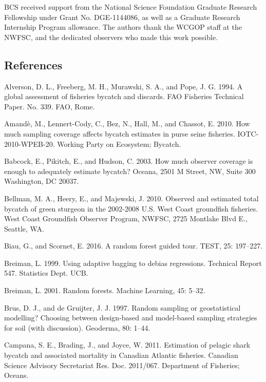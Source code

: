 \documentclass[]{article}
\begin{document}
BCS received support from the National Science Foundation Graduate
Research Fellowship under Grant No. DGE-1144086, as well as a Graduate
Research Internship Program allowance. The authors thank the WCGOP staff
at the NWFSC, and the dedicated observers who made this work possible.

\subsection{References}\label{references}

\hypertarget{refs}{}
\hypertarget{ref-alverson1994}{}
Alverson, D. L., Freeberg, M. H., Murawski, S. A., and Pope, J. G. 1994.
A global assessment of fisheries bycatch and discards. FAO Fisheries
Technical Paper. No. 339. FAO, Rome.

\hypertarget{ref-amande2010b}{}
Amandè, M., Lennert-Cody, C., Bez, N., Hall, M., and Chassot, E. 2010.
How much sampling coverage affects bycatch estimates in purse seine
fisheries. IOTC-2010-WPEB-20. Working Party on Ecosystem; Bycatch.

\hypertarget{ref-babcock2003}{}
Babcock, E., Pikitch, E., and Hudson, C. 2003. How much observer
coverage is enough to adequately estimate bycatch? Oceana, 2501 M
Street, NW, Suite 300 Washington, DC 20037.

\hypertarget{ref-bellman2010}{}
Bellman, M. A., Heery, E., and Majewski, J. 2010. Observed and estimated
total bycatch of green sturgeon in the 2002-2008 U.S. West Coast
groundfish fisheries. West Coast Groundfish Observer Program, NWFSC,
2725 Montlake Blvd E., Seattle, WA.

\hypertarget{ref-biau2016}{}
Biau, G., and Scornet, E. 2016. A random forest guided tour. TEST, 25:
197--227.

\hypertarget{ref-breiman1999}{}
Breiman, L. 1999. Using adaptive bagging to debias regressions.
Technical Report 547. Statistics Dept. UCB.

\hypertarget{ref-breiman2001}{}
Breiman, L. 2001. Random forests. Machine Learning, 45: 5--32.

\hypertarget{ref-brus1997}{}
Brus, D. J., and de Gruijter, J. J. 1997. Random sampling or
geostatistical modelling? Choosing between design-based and model-based
sampling strategies for soil (with discussion). Geoderma, 80: 1--44.

\hypertarget{ref-campana2011}{}
Campana, S. E., Brading, J., and Joyce, W. 2011. Estimation of pelagic
shark bycatch and associated mortality in Canadian Atlantic fisheries.
Canadian Science Advisory Secretariat Res. Doc. 2011/067. Department of
Fisheries; Oceans.
\end{document}
